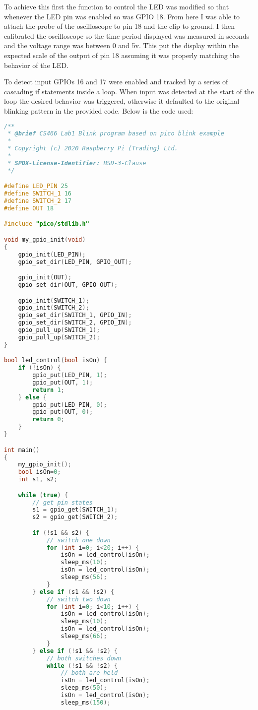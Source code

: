 \documentclass[sigconf]{article}
\begin{document}
To achieve this first the function to control the LED was modified so that whenever the LED pin was enabled so was GPIO 18. From here I was able to attach the probe of the oscilloscope to pin 18 and the clip to ground. I then calibrated the oscilloscope so the time period displayed was measured in seconds and the voltage range was between 0 and 5v. This put the display within the expected scale of the output of pin 18 assuming it was properly matching the behavior of the LED.

To detect input GPIOs 16 and 17 were enabled and tracked by a series of cascading if statements inside a loop. When input was detected at the start of the loop the desired behavior was triggered, otherwise it defaulted to the original blinking pattern in the provided code. Below is the code used:

\begin{lstlisting}[language=c,frame=single,breaklines]
/**
 * @brief CS466 Lab1 Blink program based on pico blink example
 * 
 * Copyright (c) 2020 Raspberry Pi (Trading) Ltd.
 *
 * SPDX-License-Identifier: BSD-3-Clause
 */

#define LED_PIN 25
#define SWITCH_1 16
#define SWITCH_2 17
#define OUT 18

#include "pico/stdlib.h"

void my_gpio_init(void)
{
    gpio_init(LED_PIN);
    gpio_set_dir(LED_PIN, GPIO_OUT);

    gpio_init(OUT);
    gpio_set_dir(OUT, GPIO_OUT);

    gpio_init(SWITCH_1);
    gpio_init(SWITCH_2);
    gpio_set_dir(SWITCH_1, GPIO_IN);
    gpio_set_dir(SWITCH_2, GPIO_IN);
    gpio_pull_up(SWITCH_1);
    gpio_pull_up(SWITCH_2);
}

bool led_control(bool isOn) {
    if (!isOn) {
        gpio_put(LED_PIN, 1);
        gpio_put(OUT, 1);
        return 1;
    } else {
        gpio_put(LED_PIN, 0);
        gpio_put(OUT, 0);
        return 0;
    }
}

int main() 
{
    my_gpio_init();
    bool isOn=0;
    int s1, s2;

    while (true) {
        // get pin states
        s1 = gpio_get(SWITCH_1);
        s2 = gpio_get(SWITCH_2);

        if (!s1 && s2) {
            // switch one down
            for (int i=0; i<20; i++) {
                isOn = led_control(isOn);
                sleep_ms(10);
                isOn = led_control(isOn);
                sleep_ms(56);
            }
        } else if (s1 && !s2) {
            // switch two down
            for (int i=0; i<10; i++) {
                isOn = led_control(isOn);
                sleep_ms(10);
                isOn = led_control(isOn);
                sleep_ms(66);
            }
        } else if (!s1 && !s2) {
            // both switches down
            while (!s1 && !s2) {
                // both are held
                isOn = led_control(isOn);
                sleep_ms(50);
                isOn = led_control(isOn);
                sleep_ms(150);
                

\end{lstlisting}
\end{document}
